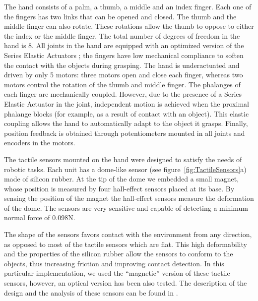 The hand consists of a palm, a thumb, a middle and an index
finger. Each one of the fingers has two links that can be opened
and closed. The thumb and the middle finger can also rotate. These
rotations allow the thumb to oppose to either the index or the
middle finger. The total number of degrees of freedom in the hand
is 8. All joints in the hand are equipped with an optimized
version of the Series Elastic Actuators \cite{actuator}; the fingers
have low mechanical compliance to soften the contact with the objects
during grasping. 
The hand is underactuated and driven by only 5 motors: 
three motors open and close each finger, whereas two motors 
control the rotation of the thumb and middle finger. The
phalanges of each finger are mechanically coupled. However, due to the
presence of a Series Elastic Actuator in the joint, independent
motion is achieved when the proximal phalange blocks (for example,
as a result of contact with an object). This elastic coupling
allows the hand to automatically adapt to the object it grasps.
Finally, position feedback is obtained through potentiometers
mounted in all joints and encoders in the motors.

The tactile sensors mounted on the hand were designed to satisfy the
needs of robotic tasks. %
Each unit has a dome-like sensor (see figure~\ref{fig:TactileSensors}a)
made of silicon rubber. At the tip of the dome we embedded a small
magnet, whose position is measured by four hall-effect sensors
placed at its base. By sensing the position of the magnet
the hall-effect sensors measure the deformation of the dome.
The sensors are very sensitive and capable of detecting a minimum
normal force of 0.098N.

The shape of the sensors favors contact with the environment from
any direction, as opposed to most of the tactile sensors which are
flat. This high deformability and the properties of the silicon
rubber allow the sensors to conform to the objects, thus
increasing friction and improving contact detection. In this
particular implementation, we used the ``magnetic'' version of
these tactile sensors, however, an optical version has been also
tested. The description of the design and the analysis of these
sensors can be found in \cite{etorresjSoft}.

